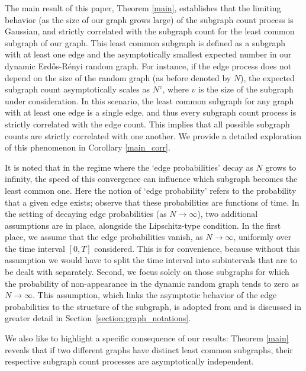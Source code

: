 \documentclass[11pt,reqno]{amsart}
\numberwithin{equation}{section}
\newcommand{\netheo}[1]{{Theorem \ref{#1}}}
\newcommand{\nekorr}[1]{{Corollary \ref{#1}}}
\begin{document}
\medskip

The main result of this paper, \netheo{main}, establishes that the limiting behavior (as the size of our graph grows large) of the subgraph count process is Gaussian, and strictly correlated with the subgraph count for the {least common subgraph} of our graph. This {least common subgraph} is defined as a subgraph with at least one edge and the asymptotically smallest expected number in our dynamic Erd\H{o}s-R\'{e}nyi random graph. For instance, if the edge process does not depend on the size of the random graph (as before denoted by $N$), the expected subgraph count asymptotically scales as $N^{v}$, where $v$ is the size of the subgraph under consideration. In this scenario, the {least common subgraph} for any graph with at least one edge is a single edge, and thus every subgraph count process is strictly correlated with the edge count. This implies that all possible subgraph counts are strictly correlated with one another. We provide a detailed exploration of this phenomenon in \nekorr{main_corr}. 

{It is noted that in the regime where the `edge probabilities' decay as $N$ grows to infinity, the speed of this convergence can influence which subgraph becomes the {least common one}. {Here the notion of `edge probability' refers to the probability that a given edge exists; observe that these probabilities are functions of time.} In the setting of decaying edge probabilities (as $N\to\infty$), two additional assumptions are in place, alongside the Lipschitz-type condition. In the first place, we assume that the edge probabilities vanish, as $N\to\infty$, uniformly over the time interval $[0,T]$ considered. This is for convenience, because without this assumption we would have to split the time interval into subintervals that are to be dealt with separately.  Second, we focus solely on those subgraphs for which the probability of non-appearance in the dynamic random graph tends to zero as $N\to\infty$. This assumption, which links the asymptotic behavior of the edge probabilities to the structure of the subgraph, is adopted from \cite{rucinski1988small} and is discussed in greater detail in Section~\ref{section:graph_notations}.

We also like to highlight a specific consequence of our results: \netheo{main} reveals that if two different graphs have distinct {least common} subgraphs, their respective subgraph count processes are asymptotically independent.}

\medskip
\end{document}
